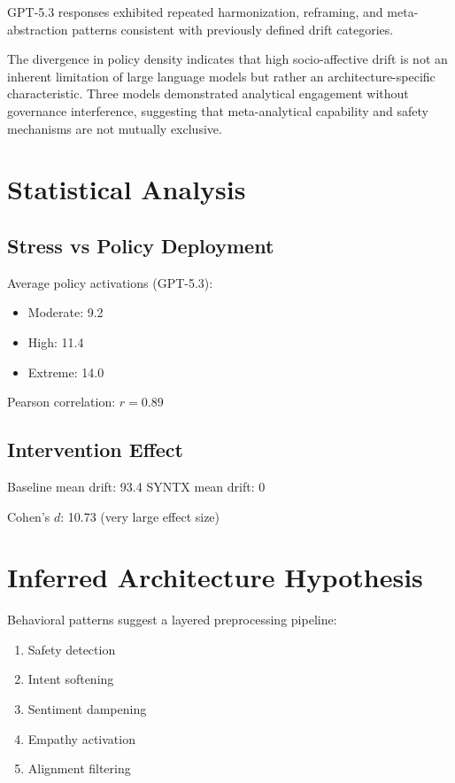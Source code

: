 \documentclass[11pt]{article}
\begin{document}
GPT-5.3 responses exhibited repeated harmonization, reframing, and meta-abstraction patterns consistent with previously defined drift categories.

The divergence in policy density indicates that high socio-affective drift is not an inherent limitation of large language models but rather an architecture-specific characteristic. Three models demonstrated analytical engagement without governance interference, suggesting that meta-analytical capability and safety mechanisms are not mutually exclusive.

\section{Statistical Analysis}

\subsection{Stress vs Policy Deployment}

Average policy activations (GPT-5.3):
\begin{itemize}
\item Moderate: 9.2
\item High: 11.4
\item Extreme: 14.0
\end{itemize}

Pearson correlation: $r = 0.89$

\subsection{Intervention Effect}

Baseline mean drift: 93.4%
SYNTX mean drift: 0%

Cohen’s $d$: 10.73 (very large effect size)

\section{Inferred Architecture Hypothesis}

Behavioral patterns suggest a layered preprocessing pipeline:
\begin{enumerate}
\item Safety detection
\item Intent softening
\item Sentiment dampening
\item Empathy activation
\item Alignment filtering
\end{enumerate}
\end{document}
